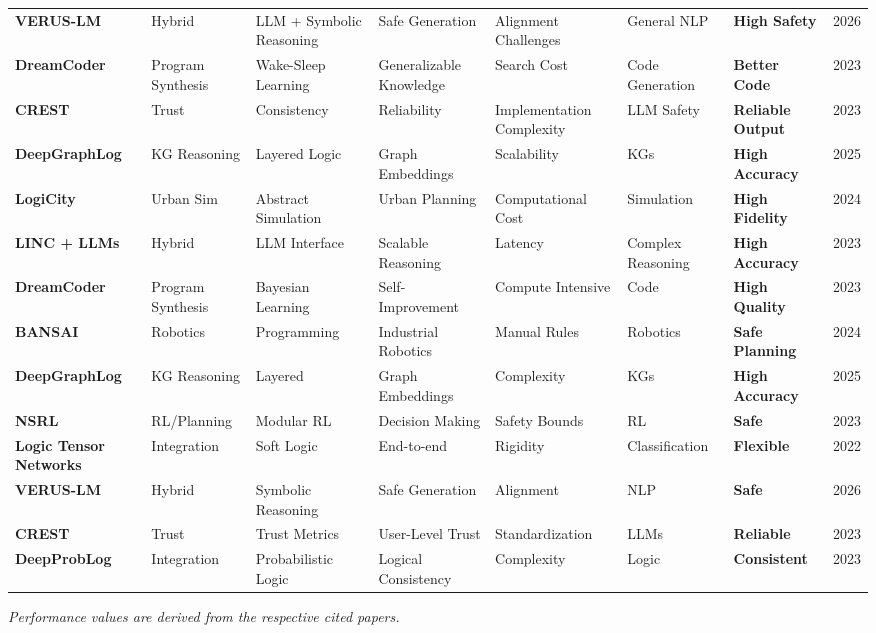 \documentclass{article}
\begin{document}
\begin{table}[ht]
{\begin{tabular}{llllllll}
\textbf{VERUS-LM} & Hybrid & LLM + Symbolic Reasoning & Safe Generation & Alignment Challenges & General NLP & \textbf{High Safety} & 2026 \\
\textbf{DreamCoder} & Program Synthesis & Wake-Sleep Learning & Generalizable Knowledge & Search Cost & Code Generation & \textbf{Better Code} & 2023 \\
\textbf{CREST} & Trust & Consistency & Reliability & Implementation Complexity & LLM Safety & \textbf{Reliable Output} & 2023 \\
\textbf{DeepGraphLog} & KG Reasoning & Layered Logic & Graph Embeddings & Scalability & KGs & \textbf{High Accuracy} & 2025 \\
\textbf{LogiCity} & Urban Sim & Abstract Simulation & Urban Planning & Computational Cost & Simulation & \textbf{High Fidelity} & 2024 \\
\textbf{LINC + LLMs} & Hybrid & LLM Interface & Scalable Reasoning & Latency & Complex Reasoning & \textbf{High Accuracy} & 2023 \\
\textbf{DreamCoder} & Program Synthesis & Bayesian Learning & Self-Improvement & Compute Intensive & Code & \textbf{High Quality} & 2023 \\
\textbf{BANSAI} & Robotics & Programming & Industrial Robotics & Manual Rules & Robotics & \textbf{Safe Planning} & 2024 \\
\textbf{DeepGraphLog} & KG Reasoning & Layered & Graph Embeddings & Complexity & KGs & \textbf{High Accuracy} & 2025 \\
\textbf{NSRL} & RL/Planning & Modular RL & Decision Making & Safety Bounds & RL & \textbf{Safe} & 2023 \\
\textbf{Logic Tensor Networks} & Integration & Soft Logic & End-to-end & Rigidity & Classification & \textbf{Flexible} & 2022 \\
\textbf{VERUS-LM} & Hybrid & Symbolic Reasoning & Safe Generation & Alignment & NLP & \textbf{Safe} & 2026 \\
\textbf{CREST} & Trust & Trust Metrics & User-Level Trust & Standardization & LLMs & \textbf{Reliable} & 2023 \\
\textbf{DeepProbLog} & Integration & Probabilistic Logic & Logical Consistency & Complexity & Logic & \textbf{Consistent} & 2023 \\
\bottomrule
\end{tabular}
}
\end{table}

\textit{Performance values are derived from the respective cited papers.}
\end{document}

